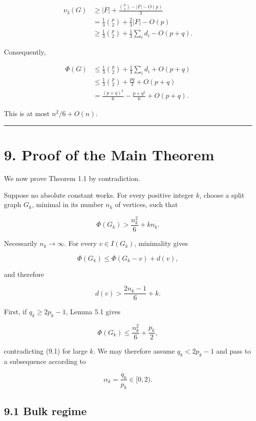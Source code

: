 \documentclass[
  11pt,
]{article}
\begin{document}
\[
\begin{aligned}
\nu_3(G)
&\ge
|F|+\frac{\binom p2-|F|-O(p)}3\\
&=
\frac13\binom p2+\frac23|F|-O(p)\\
&\ge
\frac13\binom p2+\frac13\sum_i d_i-O(p+q).
\end{aligned}
\tag{8.10}
\]

Consequently,

\[
\begin{aligned}
\Phi(G)
&\le
\frac13\binom p2+\frac13\sum_i d_i+O(p+q)\\
&\le
\frac13\binom p2+\frac{pq}{3}+O(p+q)\\
&=
\frac{(p+q)^2}{6}-\frac{p+q^2}{6}+O(p+q).
\end{aligned}
\tag{8.11}
\]

This is at most \(n^2/6+O(n)\).

\begin{center}\rule{0.5\linewidth}{0.5pt}\end{center}

\section{9. Proof of the Main Theorem}\label{proof-of-the-main-theorem}

We now prove Theorem 1.1 by contradiction.

Suppose no absolute constant works. For every positive integer \(k\),
choose a split graph \(G_k\), minimal in its number \(n_k\) of vertices,
such that

\[
\Phi(G_k)
>
\frac{n_k^2}{6}+kn_k.
\tag{9.1}
\]

Necessarily \(n_k\to\infty\). For every \(v\in I(G_k)\), minimality
gives

\[
\Phi(G_k)
\le
\Phi(G_k-v)+d(v),
\]

and therefore

\[
\boxed{
d(v)>
\frac{2n_k-1}{6}+k.
}
\tag{9.2}
\]

First, if \(q_k\ge2p_k-1\), Lemma 5.1 gives

\[
\Phi(G_k)
\le
\frac{n_k^2}{6}+\frac{p_k}{2},
\]

contradicting (9.1) for large \(k\). We may therefore assume
\(q_k<2p_k-1\) and pass to a subsequence according to

\[
\alpha_k=\frac{q_k}{p_k}\in[0,2).
\]

\subsection{9.1 Bulk regime}\label{bulk-regime}
\end{document}
